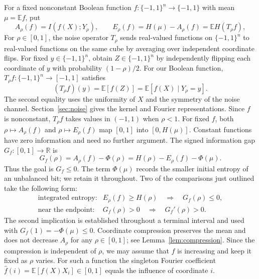\documentclass[11pt,letterpaper]{amsart}
\newcommand{\E}{\mathbb E}
\newcommand{\R}{\mathbb R}
\newcommand{\1}{\mathbf 1}
\numberwithin{equation}{section}
\begin{document}
For a fixed nonconstant Boolean function $f:\{-1,1\}^n\to\{-1,1\}$
with mean $\mu=\E f$, put
\begin{equation}\label{eq:information-entropy}
 A_\rho(f)=I(f(X);Y_\rho),\qquad
 E_\rho(f)=H(\mu)-A_\rho(f)=\E H(T_\rho f),
\end{equation}
For $\rho\in[0,1]$, the noise operator $T_\rho$ sends real-valued
functions on $\{-1,1\}^n$ to real-valued functions on the same cube
by averaging over independent coordinate flips. For fixed
$y\in\{-1,1\}^n$, obtain $Z\in\{-1,1\}^n$ by independently
flipping each coordinate of $y$ with probability $(1-\rho)/2$.
For our Boolean function, $T_\rho f:\{-1,1\}^n\to[-1,1]$ satisfies
\[
 (T_\rho f)(y)=\E[f(Z)]=\E[f(X)\mid Y_\rho=y].
\]
The second equality uses the uniformity of $X$ and the symmetry of
the noise channel. Section~\ref{sec:noise} gives the kernel and Fourier
representations. Since $f$ is nonconstant, $T_\rho f$ takes values in
$(-1,1)$ when $\rho<1$. For fixed $f$, both $\rho\mapsto A_\rho(f)$
and $\rho\mapsto E_\rho(f)$ map $[0,1]$ into $[0,H(\mu)]$.
Constant functions have zero information and need no further argument.
The signed information gap $G_f:[0,1]\to\R$ is
\begin{equation}\label{ub:gap-definitions}
 G_f(\rho)=A_\rho(f)-\Phi(\rho)
          =H(\rho)-E_\rho(f)-\Phi(\mu).
\end{equation}
Thus the goal is $G_f\le0$. The term $\Phi(\mu)$ records the smaller
initial entropy of an unbalanced bit; we retain it throughout.
Two of the comparisons just outlined take the following form:
\[
 \begin{array}{ll}
 \text{integrated entropy:}&
 E_\rho(f)\ge H(\rho)\quad\Longrightarrow\quad G_f(\rho)\le0,\\
 \text{near the endpoint:}&
 G_f(\rho)>0\quad\Longrightarrow\quad G_f'(\rho)>0.
 \end{array}
\]
The second implication is established throughout a terminal interval
and used with $G_f(1)=-\Phi(\mu)\le0$.
Coordinate compression preserves the mean and does not decrease
$A_\rho$ for any $\rho\in[0,1]$;
see Lemma~\ref{lem:compression}.
Since the compression is independent of $\rho$, we may assume
that $f$ is increasing and keep it fixed as $\rho$ varies.
For such a function the singleton Fourier coefficient
$\widehat f(i)=\E[f(X)X_i]\in[0,1]$ equals the influence of coordinate $i$.
\end{document}
